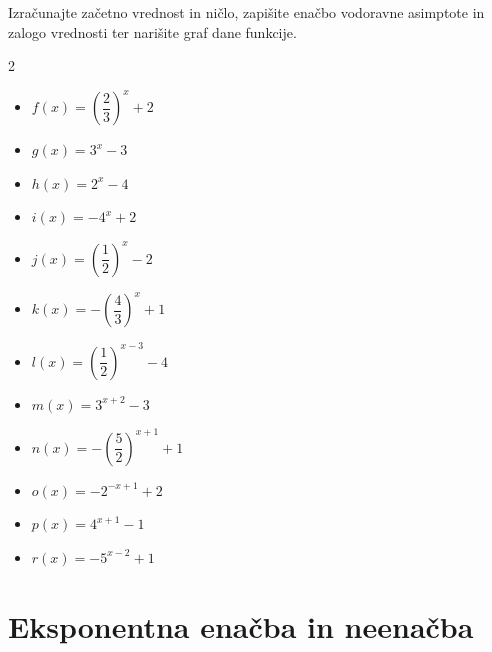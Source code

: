    \begin{naloga}
        Izračunajte začetno vrednost in ničlo, zapišite enačbo vodoravne asimptote in zalogo vrednosti ter narišite graf dane funkcije.
        \begin{multicols}{2}
            
        \begin{itemize}
            \item $f(x)=\left(\dfrac{2}{3}\right)^x+2$
            \item $g(x)=3^x-3$
            \item $h(x)=2^x-4$
            \item $i(x)=-4^x+2$
            \item $j(x)=\left(\dfrac{1}{2}\right)^x-2$
            \item $k(x)=-\left(\dfrac{4}{3}\right)^x+1$
            
            \item $l(x)=\left(\dfrac{1}{2}\right)^{x-3}-4$
            \item $m(x)=3^{x+2}-3$
            \item $n(x)=-\left(\dfrac{5}{2}\right)^{x+1}+1$
            \item $o(x)=-2^{-x+1}+2$
            \item $p(x)=4^{x+1}-1$
            \item $r(x)=-5^{x-2}+1$
        \end{itemize}
        \end{multicols}

    \end{naloga}
    

\newpage
\section{Eksponentna enačba in neenačba}


\newpage

